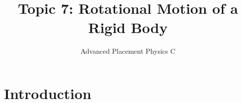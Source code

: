 \documentclass[12pt,compress,aspectratio=169]{beamer}
\title{Topic 7: Rotational Motion of a Rigid Body}
\subtitle{Advanced Placement Physics C}
\begin{document}
\begin{frame}
  \maketitle
\end{frame}




\section{Introduction}
\end{document}
